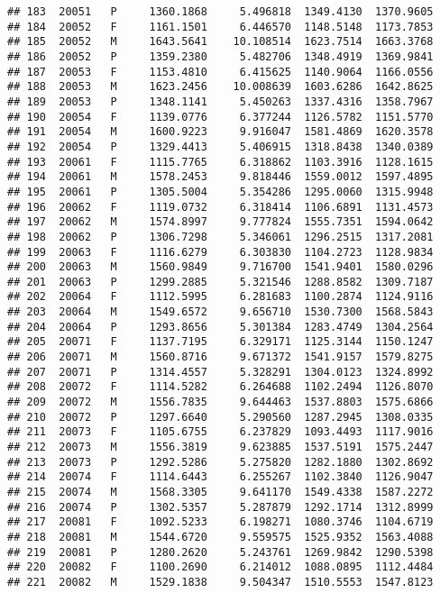 \documentclass[]{article}
\begin{document}
\begin{verbatim}
## 183  20051   P     1360.1868     5.496818  1349.4130  1370.9605
## 184  20052   F     1161.1501     6.446570  1148.5148  1173.7853
## 185  20052   M     1643.5641    10.108514  1623.7514  1663.3768
## 186  20052   P     1359.2380     5.482706  1348.4919  1369.9841
## 187  20053   F     1153.4810     6.415625  1140.9064  1166.0556
## 188  20053   M     1623.2456    10.008639  1603.6286  1642.8625
## 189  20053   P     1348.1141     5.450263  1337.4316  1358.7967
## 190  20054   F     1139.0776     6.377244  1126.5782  1151.5770
## 191  20054   M     1600.9223     9.916047  1581.4869  1620.3578
## 192  20054   P     1329.4413     5.406915  1318.8438  1340.0389
## 193  20061   F     1115.7765     6.318862  1103.3916  1128.1615
## 194  20061   M     1578.2453     9.818446  1559.0012  1597.4895
## 195  20061   P     1305.5004     5.354286  1295.0060  1315.9948
## 196  20062   F     1119.0732     6.318414  1106.6891  1131.4573
## 197  20062   M     1574.8997     9.777824  1555.7351  1594.0642
## 198  20062   P     1306.7298     5.346061  1296.2515  1317.2081
## 199  20063   F     1116.6279     6.303830  1104.2723  1128.9834
## 200  20063   M     1560.9849     9.716700  1541.9401  1580.0296
## 201  20063   P     1299.2885     5.321546  1288.8582  1309.7187
## 202  20064   F     1112.5995     6.281683  1100.2874  1124.9116
## 203  20064   M     1549.6572     9.656710  1530.7300  1568.5843
## 204  20064   P     1293.8656     5.301384  1283.4749  1304.2564
## 205  20071   F     1137.7195     6.329171  1125.3144  1150.1247
## 206  20071   M     1560.8716     9.671372  1541.9157  1579.8275
## 207  20071   P     1314.4557     5.328291  1304.0123  1324.8992
## 208  20072   F     1114.5282     6.264688  1102.2494  1126.8070
## 209  20072   M     1556.7835     9.644463  1537.8803  1575.6866
## 210  20072   P     1297.6640     5.290560  1287.2945  1308.0335
## 211  20073   F     1105.6755     6.237829  1093.4493  1117.9016
## 212  20073   M     1556.3819     9.623885  1537.5191  1575.2447
## 213  20073   P     1292.5286     5.275820  1282.1880  1302.8692
## 214  20074   F     1114.6443     6.255267  1102.3840  1126.9047
## 215  20074   M     1568.3305     9.641170  1549.4338  1587.2272
## 216  20074   P     1302.5357     5.287879  1292.1714  1312.8999
## 217  20081   F     1092.5233     6.198271  1080.3746  1104.6719
## 218  20081   M     1544.6720     9.559575  1525.9352  1563.4088
## 219  20081   P     1280.2620     5.243761  1269.9842  1290.5398
## 220  20082   F     1100.2690     6.214012  1088.0895  1112.4484
## 221  20082   M     1529.1838     9.504347  1510.5553  1547.8123

\end{verbatim}
\end{document}

